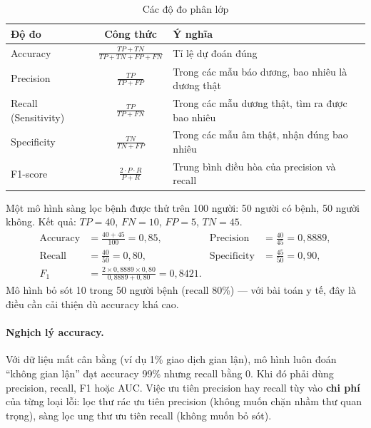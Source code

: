 \begin{table}[H]
\centering
\begin{tabular}{|l|c|p{6cm}|}
\hline
\textbf{Độ đo} & \textbf{Công thức} & \textbf{Ý nghĩa} \\
\hline
Accuracy & $\frac{TP + TN}{TP + TN + FP + FN}$ & Tỉ lệ dự đoán đúng \\[4pt] \hline
Precision & $\frac{TP}{TP + FP}$ & Trong các mẫu báo dương, bao nhiêu là dương thật \\[4pt] \hline
Recall (Sensitivity) & $\frac{TP}{TP + FN}$ & Trong các mẫu dương thật, tìm ra được bao nhiêu \\[4pt] \hline
Specificity & $\frac{TN}{TN + FP}$ & Trong các mẫu âm thật, nhận đúng bao nhiêu \\[4pt] \hline
F1-score & $\frac{2 \cdot P \cdot R}{P + R}$ & Trung bình điều hòa của precision và recall \\[4pt] \hline
\end{tabular}
\caption{Các độ đo phân lớp}
\end{table}

\begin{example}
Một mô hình sàng lọc bệnh được thử trên 100 người: 50 người có bệnh, 50 người không. Kết quả: $TP = 40$, $FN = 10$, $FP = 5$, $TN = 45$.
\begin{align*}
    \text{Accuracy} &= \tfrac{40 + 45}{100} = 0{,}85, &
    \text{Precision} &= \tfrac{40}{45} = 0{,}8889, \\
    \text{Recall} &= \tfrac{40}{50} = 0{,}80, &
    \text{Specificity} &= \tfrac{45}{50} = 0{,}90, \\
    F_1 &= \tfrac{2 \times 0{,}8889 \times 0{,}80}{0{,}8889 + 0{,}80} = 0{,}8421 .
\end{align*}
Mô hình bỏ sót 10 trong 50 người bệnh (recall 80\%) --- với bài toán y tế, đây là điều cần cải thiện dù accuracy khá cao.
\end{example}

\paragraph{Nghịch lý accuracy.} Với dữ liệu mất cân bằng (ví dụ 1\% giao dịch gian lận), mô hình luôn đoán ``không gian lận'' đạt accuracy 99\% nhưng recall bằng 0. Khi đó phải dùng precision, recall, F1 hoặc AUC. Việc ưu tiên precision hay recall tùy vào \textbf{chi phí} của từng loại lỗi: lọc thư rác ưu tiên precision (không muốn chặn nhầm thư quan trọng), sàng lọc ung thư ưu tiên recall (không muốn bỏ sót).

